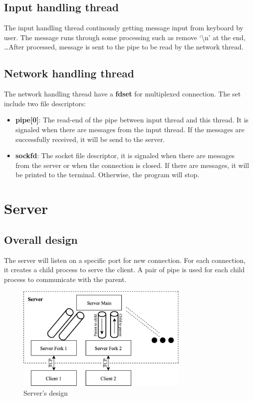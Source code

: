 \documentclass[12pt]{article}
\begin{document}
\subsection{Input handling thread}

The input handling thread continously getting message input from keyboard by user. The message runs through some processing such as remove `\textbackslash n' at the end, \dots After processed, message is sent to the pipe to be read by the network thread.

\subsection{Network handling thread}

The network handling thread have a \textbf{fdset} for multiplexed connection. The set include two file descriptors:

\begin{itemize}
\item \textbf{pipe[0]}: The read-end of the pipe between input thread and this thread. It is signaled when there are messages from the input thread. If the messages are successfully received, it will be send to the server.

\item \textbf{sockfd}: The socket file descriptor, it is signaled when there are messages from the server or when the connection is closed. If there are messages, it will be printed to the terminal. Otherwise, the program will stop.
\end{itemize}

\section{Server}

\subsection{Overall design}

The server will listen on a specific port for new connection. For each connection, it creates a child process to serve the client. A pair of pipe is used for each child process to communicate with the parent.

\begin{figure}[H]
\centering
\includegraphics[width=0.75\textwidth]{server_diagram.png}
\caption{Server's design}
\end{figure}
\end{document}
